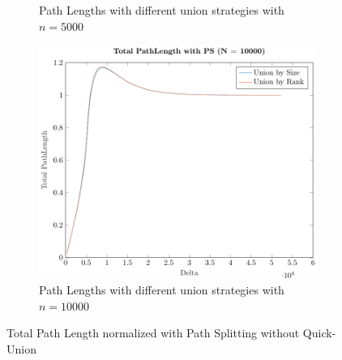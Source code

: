 \begin{figure}[ht]
\begin{subfigure}{0.32\textwidth}
        \caption{Path Lengths with different union strategies with $n = 5000$}
    \end{subfigure}%
    \hfill
    \begin{subfigure}{0.32\textwidth}
        \centering
        \includegraphics[width=\textwidth]{../images/plotPSNonFull10000_PathLength.pdf}
        \caption{Path Lengths with different union strategies with $n = 10000$}
    \end{subfigure}

    \caption{Total Path Length normalized with Path Splitting without Quick-Union}
    \label{fig:tplPSNoQU}
\end{figure}

